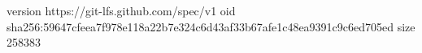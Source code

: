 version https://git-lfs.github.com/spec/v1
oid sha256:59647cfeea7f978e118a22b7e324c6d43af33b67afe1c48ea9391c9c6ed705ed
size 258383

